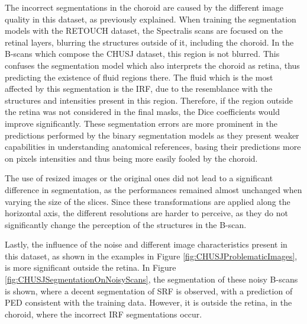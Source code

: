 The incorrect segmentations in the choroid are caused by the different image quality in this dataset, as previously explained. When training the segmentation models with the RETOUCH dataset, the Spectralis scans are focused on the retinal layers, blurring the structures outside of it, including the choroid. In the B-scans which compose the CHUSJ dataset, this region is not blurred. This confuses the segmentation model which also interprets the choroid as retina, thus predicting the existence of fluid regions there. The fluid which is the most affected by this segmentation is the IRF, due to the resemblance with the structures and intensities present in this region. Therefore, if the region outside the retina was not considered in the final masks, the Dice coefficients would improve significantly. These segmentation errors are more prominent in the predictions performed by the binary segmentation models as they present weaker capabilities in understanding anatomical references, basing their predictions more on pixels intensities and thus being more easily fooled by the choroid.
\par
The use of resized images or the original ones did not lead to a significant difference in segmentation, as the performances remained almost unchanged when varying the size of the slices. Since these transformations are applied along the horizontal axis, the different resolutions are harder to perceive, as they do not significantly change the perception of the structures in the B-scan.
\par
Lastly, the influence of the noise and different image characteristics present in this dataset, as shown in the examples in Figure \ref{fig:CHUSJProblematicImages}, is more significant outside the retina. In Figure \ref{fig:CHUSJSegmentationOnNoisyScans}, the segmentation of these noisy B-scans is shown, where a decent segmentation of SRF is observed, with a prediction of PED consistent with the training data. However, it is outside the retina, in the choroid, where the incorrect IRF segmentations occur.

